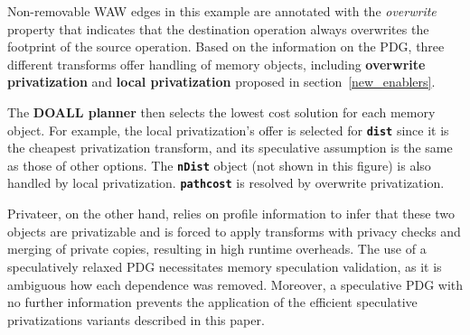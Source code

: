 Non-removable WAW edges in this example are annotated with
the \textit{overwrite} property that indicates that the destination
operation always overwrites the footprint of the source operation.
%
Based on the information on the PDG, three different transforms offer
handling of memory objects, including \textbf{overwrite privatization} and
\textbf{local privatization} proposed in
section~\cref{new_enablers}.

%
%
The \textbf{DOALL planner} then selects the lowest cost solution for each memory
object. For example, the local privatization's
offer is selected for \texttt{\textbf{dist}} since it is the cheapest
privatization transform, and its
speculative assumption is the same as those of other options.
The \texttt{\textbf{nDist}} object (not shown in this figure) is also handled
by local privatization. \texttt{\textbf{pathcost}} is resolved by overwrite
privatization.



%
Privateer, on the other hand, relies on profile information to infer
that these two objects are privatizable and is forced to apply
transforms with privacy checks and merging of private copies,
resulting in high runtime overheads. The use of a speculatively
relaxed PDG necessitates memory speculation validation, as it is
ambiguous how each dependence was removed.  Moreover, a speculative
PDG with no further information prevents the application of the
efficient speculative privatizations variants described in this paper.

%





